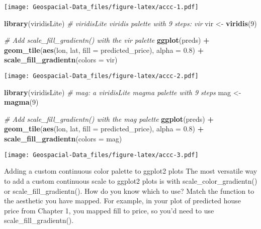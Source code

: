\documentclass[]{article}
\newenvironment{Shaded}{\begin{snugshade}}{\end{snugshade}}
\newcommand{\CommentTok}[1]{\textcolor[rgb]{0.56,0.35,0.01}{\textit{#1}}}
\newcommand{\DataTypeTok}[1]{\textcolor[rgb]{0.13,0.29,0.53}{#1}}
\newcommand{\DecValTok}[1]{\textcolor[rgb]{0.00,0.00,0.81}{#1}}
\newcommand{\FloatTok}[1]{\textcolor[rgb]{0.00,0.00,0.81}{#1}}
\newcommand{\KeywordTok}[1]{\textcolor[rgb]{0.13,0.29,0.53}{\textbf{#1}}}
\newcommand{\NormalTok}[1]{#1}
\newcommand{\OperatorTok}[1]{\textcolor[rgb]{0.81,0.36,0.00}{\textbf{#1}}}
\newcommand{\StringTok}[1]{\textcolor[rgb]{0.31,0.60,0.02}{#1}}
\begin{document}
\texttt{[image: Geospacial-Data\_files/figure-latex/accc-1.pdf]}

\begin{Shaded}
\begin{Highlighting}[]
\KeywordTok{library}\NormalTok{(viridisLite)}
\CommentTok{# viridisLite viridis palette with 9 steps: vir}
\NormalTok{vir <-}\StringTok{ }\KeywordTok{viridis}\NormalTok{(}\DecValTok{9}\NormalTok{)}

\CommentTok{# Add scale_fill_gradientn() with the vir palette}
\KeywordTok{ggplot}\NormalTok{(preds) }\OperatorTok{+}
\StringTok{  }\KeywordTok{geom_tile}\NormalTok{(}\KeywordTok{aes}\NormalTok{(lon, lat, }\DataTypeTok{fill =}\NormalTok{ predicted_price), }\DataTypeTok{alpha =} \FloatTok{0.8}\NormalTok{) }\OperatorTok{+}
\StringTok{  }\KeywordTok{scale_fill_gradientn}\NormalTok{(}\DataTypeTok{colors =}\NormalTok{ vir)}
\end{Highlighting}
\end{Shaded}

\texttt{[image: Geospacial-Data\_files/figure-latex/accc-2.pdf]}

\begin{Shaded}
\begin{Highlighting}[]
\KeywordTok{library}\NormalTok{(viridisLite)}
\CommentTok{# mag: a viridisLite magma palette with 9 steps}
\NormalTok{mag <-}\StringTok{ }\KeywordTok{magma}\NormalTok{(}\DecValTok{9}\NormalTok{)}

\CommentTok{# Add scale_fill_gradientn() with the mag palette}
\KeywordTok{ggplot}\NormalTok{(preds) }\OperatorTok{+}
\StringTok{  }\KeywordTok{geom_tile}\NormalTok{(}\KeywordTok{aes}\NormalTok{(lon, lat, }\DataTypeTok{fill =}\NormalTok{ predicted_price), }\DataTypeTok{alpha =} \FloatTok{0.8}\NormalTok{) }\OperatorTok{+}
\StringTok{  }\KeywordTok{scale_fill_gradientn}\NormalTok{(}\DataTypeTok{colors =}\NormalTok{ mag) }
\end{Highlighting}
\end{Shaded}

\texttt{[image: Geospacial-Data\_files/figure-latex/accc-3.pdf]}

Adding a custom continuous color palette to ggplot2 plots The most
versatile way to add a custom continuous scale to ggplot2 plots is with
scale\_color\_gradientn() or scale\_fill\_gradientn(). How do you know
which to use? Match the function to the aesthetic you have mapped. For
example, in your plot of predicted house price from Chapter 1, you
mapped fill to price, so you'd need to use scale\_fill\_gradientn().
\end{document}
